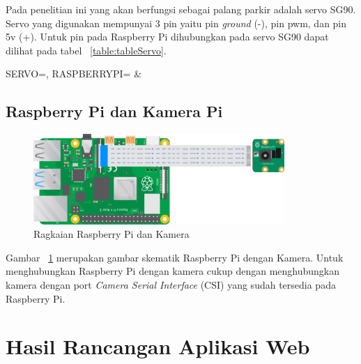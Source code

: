 Pada penelitian ini yang akan berfungsi sebagai palang parkir adalah servo SG90. Servo yang digunakan mempunyai 3 pin yaitu pin \textit{ground} (-), pin pwm, dan pin 5v (+). Untuk pin pada Raspberry Pi dihubungkan pada servo SG90 dapat dilihat pada tabel ~\ref{table:tableServo}.

\begin{atable}
    \caption{Rangkaian pin Servo ke Raspberry Pi}
    \label{table:tableServo}
        {
            SERVO=\SERVO, 
            RASPBERRYPI=\RASPBERRYPI}
        {
            \SERVO & 
            \RASPBERRYPI}
\end{atable}

\subsection{Raspberry Pi dan Kamera Pi}
\begin{figure} [H]
    \includegraphics[width=0.85\textwidth, center]{images/skematik-kamera.png}
    \caption{Ragkaian Raspberry Pi dan Kamera}
    \label{fig:skematikKamera}
\end{figure}

Gambar ~\ref{fig:skematikKamera} merupakan gambar skematik Raspberry Pi dengan Kamera. Untuk menghubungkan Raspberry Pi dengan kamera cukup dengan menghubungkan kamera dengan port \textit{Camera Serial Interface} (CSI) yang sudah tersedia pada Raspberry Pi.


\section{Hasil Rancangan Aplikasi Web}

